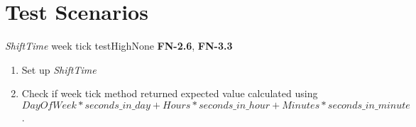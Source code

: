 \chapter{Test Scenarios} \label{chp:test-scenarios}
	\begin{testcase}{\emph{ShiftTime} week tick test}{High}{None}
		{
			\textbf{FN-2.6}, \textbf{FN-3.3}
		}
		{
			\begin{enumerate}
				\item Set up \emph{ShiftTime}
				\item Check if week tick method returned expected value calculated using $DayOfWeek * seconds\_in\_day + Hours * seconds\_in\_hour + Minutes * seconds\_in\_minute$.
			\end{enumerate}
		}
	\end{testcase}